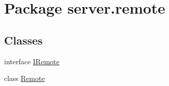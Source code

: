 \hypertarget{namespaceserver_1_1remote}{}\section{Package server.\+remote}
\label{namespaceserver_1_1remote}
\subsection*{Classes}
\begin{DoxyCompactItemize}
\item 
interface \hyperlink{interfaceserver_1_1remote_1_1_i_remote}{I\+Remote}
\item 
class \hyperlink{classserver_1_1remote_1_1_remote}{Remote}
\end{DoxyCompactItemize}
